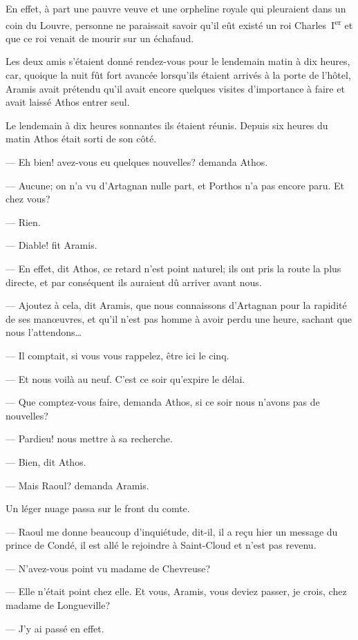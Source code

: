En effet, à part une pauvre veuve et une orpheline royale qui pleuraient dans un coin du Louvre, personne ne paraissait savoir qu'il eût existé un roi Charles~I\textsuperscript{er} et que ce roi venait de mourir sur un échafaud.

Les deux amis s'étaient donné rendez-vous pour le lendemain matin à dix heures, car, quoique la nuit fût fort avancée lorsqu'ils étaient arrivés à la porte de l'hôtel, Aramis avait prétendu qu'il avait encore quelques visites d'importance à faire et avait laissé Athos entrer seul.

Le lendemain à dix heures sonnantes ils étaient réunis. Depuis six heures du matin Athos était sorti de son côté.

— Eh bien! avez-vous eu quelques nouvelles? demanda Athos.

— Aucune; on n'a vu d'Artagnan nulle part, et Porthos n'a pas encore paru. Et chez vous?

— Rien.

— Diable! fit Aramis.

— En effet, dit Athos, ce retard n'est point naturel; ils ont pris la route la plus directe, et par conséquent ils auraient dû arriver avant nous.

— Ajoutez à cela, dit Aramis, que nous connaissons d'Artagnan pour la rapidité de ses manœuvres, et qu'il n'est pas homme à avoir perdu une heure, sachant que nous l'attendons\dots

— Il comptait, si vous vous rappelez, être ici le cinq.

— Et nous voilà au neuf. C'est ce soir qu'expire le délai.

— Que comptez-vous faire, demanda Athos, si ce soir nous n'avons pas de nouvelles?

— Pardieu! nous mettre à sa recherche.

— Bien, dit Athos.

— Mais Raoul? demanda Aramis.

Un léger nuage passa sur le front du comte.

— Raoul me donne beaucoup d'inquiétude, dit-il, il a reçu hier un message du prince de Condé, il est allé le rejoindre à Saint-Cloud et n'est pas revenu.

— N'avez-vous point vu madame de Chevreuse?

— Elle n'était point chez elle. Et vous, Aramis, vous deviez passer, je crois, chez madame de Longueville?

— J'y ai passé en effet.

